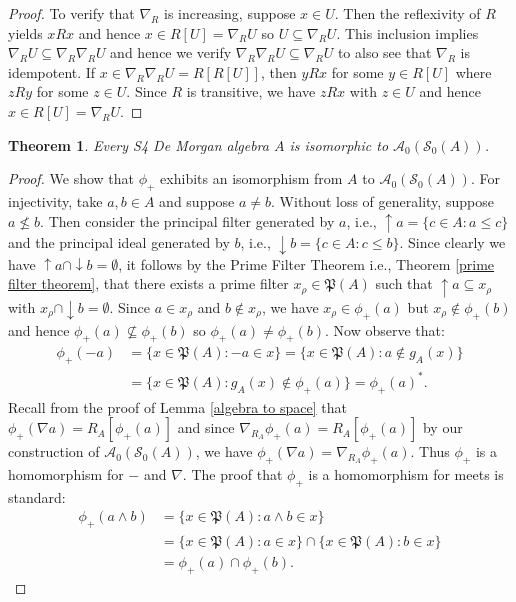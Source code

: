 \documentclass{amsart}
\theoremstyle{plain}
\newtheorem{theorem}{Theorem}[section]
\theoremstyle{definition}
\begin{document}
\begin{proof}
    To verify that $\nabla_R$ is increasing, suppose $x\in U$. Then the reflexivity of $R$ yields $xRx$ and hence $x\in R[U]=\nabla_RU$ so $U\subseteq\nabla_RU$. This inclusion implies $\nabla_RU\subseteq\nabla_R\nabla_RU$ and hence we verify $\nabla_R\nabla_RU\subseteq\nabla_RU$ to also see that $\nabla_R$ is idempotent. If $x\in \nabla_R\nabla_RU=R[R[U]]$, then $yRx$ for some $y\in R[U]$ where $zRy$ for some $z\in U$. Since $R$ is transitive, we have $zRx$ with $z\in U$ and hence $x\in R[U]=\nabla_RU$.      
\end{proof}


\begin{theorem}\label{rep thm}
    Every S4 De Morgan algebra $A$ is isomorphic to $\mathcal{A}_0(\mathcal{S}_0(A))$. 
\end{theorem}
\begin{proof}
  We show that $\phi_+$ exhibits an isomorphism from $A$ to $\mathcal{A}_0(\mathcal{S}_0(A))$. For injectivity, take $a,b\in A$ and suppose $a\not=b$. Without loss of generality, suppose $a\not\leq b$. Then consider the principal filter generated by $a$, i.e., ${\uparrow}a=\{c\in A:a\leq c\}$ and the principal ideal generated by $b$, i.e., ${\downarrow}b=\{c\in A:c\leq b\}$. Since clearly we have ${\uparrow}a\cap{\downarrow}b=\emptyset$, it follows by the Prime Filter Theorem i.e., Theorem \ref{prime filter theorem}, that there exists a prime filter $x_\rho\in\mathfrak{P}(A)$ such that ${\uparrow}a\subseteq x_\rho$ with $x_\rho\cap{\downarrow}b=\emptyset$. Since $a\in x_\rho$ and $b\not\in x_\rho$, we have $x_\rho\in\phi_+(a)$ but $x_\rho\not\in\phi_+(b)$ and hence $\phi_+(a)\not\subseteq\phi_+(b)$ so $\phi_+(a)\not=\phi_+(b)$. Now observe that: 
  \begin{align*}
      \phi_+(-a)&=\{x\in\mathfrak{P}(A):-a\in x\}=\{x\in\mathfrak{P}(A):a\not\in g_A(x)\}\\&=\{x\in\mathfrak{P}(A):g_A(x)\not\in\phi_+(a)\}=\phi_+(a)^*.
  \end{align*}
  Recall from the proof of Lemma \ref{algebra to space} that $\phi_+(\nabla a)=R_A[\phi_+(a)]$ and since $\nabla_{R_A}\phi_+(a)=R_A[\phi_+(a)]$ by our construction of $\mathcal{A}_0(\mathcal{S}_0(A))$, we have $\phi_+(\nabla a)=\nabla_{R_A}\phi_+(a)$. Thus $\phi_+$ is a homomorphism for $-$ and $\nabla$. The proof that $\phi_+$ is a homomorphism for meets is standard: 
\begin{align*}
    \phi_+(a\wedge b)&=\{x\in\mathfrak{P}(A):a\wedge b\in x\}\\&=\{x\in\mathfrak{P}(A):a\in x\}\cap\{x\in\mathfrak{P}(A):b\in x\}\\&=\phi_+(a)\cap\phi_+(b).

\end{align*}
\end{proof}
\end{document}
